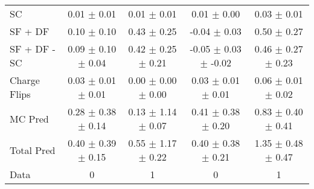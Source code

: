 \begin{tabular}{l|cccc}
                                 SC &  0.01 $\pm$  0.01 &  0.01 $\pm$  0.01 &  0.01 $\pm$  0.00 &  0.03 $\pm$  0.01 \\
                            SF + DF &  0.10 $\pm$  0.10 &  0.43 $\pm$  0.25 & -0.04 $\pm$  0.03 &  0.50 $\pm$  0.27 \\
\hline
                       SF + DF - SC &  0.09 $\pm$  0.10 $\pm$  0.04 &  0.42 $\pm$  0.25 $\pm$  0.21 & -0.05 $\pm$  0.03 $\pm$ -0.02 &  0.46 $\pm$  0.27 $\pm$  0.23 \\
\hline\hline
                       Charge Flips &  0.03 $\pm$  0.01 $\pm$  0.01 &  0.00 $\pm$  0.00 $\pm$  0.00 &  0.03 $\pm$  0.01 $\pm$  0.01 &  0.06 $\pm$  0.01 $\pm$  0.02 \\
\hline
                            MC Pred &  0.28 $\pm$  0.38 $\pm$  0.14 &  0.13 $\pm$  1.14 $\pm$  0.07 &  0.41 $\pm$  0.38 $\pm$  0.20 &  0.83 $\pm$  0.40 $\pm$  0.41 \\
\hline
                         Total Pred &  0.40 $\pm$  0.39 $\pm$  0.15 &  0.55 $\pm$  1.17 $\pm$  0.22 &  0.40 $\pm$  0.38 $\pm$  0.21 &  1.35 $\pm$  0.48 $\pm$  0.47 \\
\hline\hline
                               Data &     0 &     1 &     0 &     1 \\
\hline\hline
\end{tabular}

